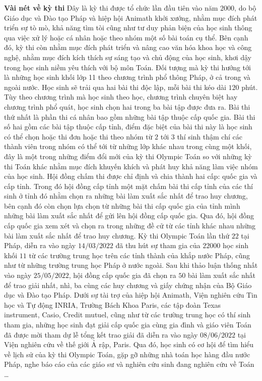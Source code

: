 \begin{multicols}{2}
	\textbf{\color{cackithi}Vài nét về kỳ thi}
	\vskip 0.1cm
	Đây là kỳ thi được tổ chức lần đầu tiên vào năm $2000$, do bộ Giáo dục và Đào tạo Pháp và hiệp hội Animath khởi xướng, nhằm mục đích phát triển sự tò mò, khả năng tìm tòi cũng như tư duy phản biện của học sinh thông qua việc xử lý hoặc cá nhân hoặc theo nhóm một số bài toán cụ thể. Bên cạnh đó, kỳ thi còn nhằm mục đích phát triển và nâng cao văn hóa khoa học và công nghệ, nhằm mục đích kích thích sự sáng tạo và chủ động của học sinh, khơi dậy trong học sinh niềm yêu thích với bộ môn Toán. Đối tượng mà kỳ thi hướng tới là những học sinh khối lớp 11 theo chương trình phổ thông Pháp, ở cả trong và ngoài nước. 
	\vskip 0.1cm
	Học sinh sẽ trải qua hai bài thi độc lập, mỗi bài thi kéo dài $120$ phút. Tùy theo chương trình mà học sinh theo học, chương trình chuyên biệt hay chương trình phổ quát, học sinh chọn hai trong ba bài tập được đưa ra. Bài thi thứ nhất là phần thi cá nhân bao gồm những bài tập thuộc cấp quốc gia. Bài thi số hai gồm các bài tập thuộc cấp tỉnh, điểm đặc biệt của bài thi này là học sinh có thể chọn hoặc thi đơn hoặc thi theo nhóm từ $2$ tới $3$ thí sinh thậm chí các thành viên trong nhóm có thể tới từ những lớp khác nhau trong cùng một khối, đây là một trong những điểm đổi mới của kỳ thi Olympic Toán so với những kỳ thi Toán khác nhằm mục đích khuyến khích và phát huy khả năng làm việc nhóm của học sinh.
	\vskip 0.1cm 
	Hội đồng chấm thi được chỉ định và chia thành hai cấp: quốc gia và cấp tỉnh. Trong đó hội đồng cấp tỉnh một mặt chấm bài thi cấp tỉnh của các thí sinh ở tỉnh đó nhằm chọn ra những bài làm xuất sắc nhất để trao huy chương, bên cạnh đó còn chọn lựa chọn từ những bài thi cấp quốc gia của tỉnh mình những bài làm xuất sắc nhất để gửi lên hội đồng cấp quốc gia. Qua đó, hội đồng cấp quốc gia xem xét và chọn ra trong những đề cử từ các tỉnh khác nhau những bài làm xuất sắc nhất để trao huy chương. 
	\vskip 0.1cm
	Kỳ thi Olympic Toán lần thứ $22$ tại Pháp, diễn ra vào ngày $14/03/2022$ đã thu hút sự tham gia của $22000$ học sinh khối $11$ từ các trường trung học trên các tỉnh thành của khắp nước Pháp, cũng như từ những trường trung học Pháp ở nước ngoài. Sau khi thảo luận thống nhất vào ngày $25/05/2022$, hội đồng cấp quốc gia đã chọn ra $50$ bài làm xuất sắc nhất để trao giải nhất, nhì, ba cùng các huy chương và giấy chứng nhận của Bộ Giáo dục và Đào tạo Pháp. Dưới sự tài trợ của hiệp hội Animath, Viện nghiên cứu Tin học và Tự động  INRIA, Trường Bách Khoa Paris, các tập đoàn Texas instrument, Casio, Credit mutuel, cũng như từ các trường trung học có thí sinh tham gia, những học sinh đạt giải cấp quốc gia cùng gia đình và giáo viên Toán đã được mời tham dự lễ tổng kết trao giải đã diễn ra vào ngày $08/06/2022$ tại Viện nghiên cứu về thế giới Ả rập, Paris. Qua đó, học sinh có cơ hội để tìm hiểu về lịch sử của kỳ thi Olympic Toán, gặp gỡ những nhà toán học hàng đầu nước Pháp, nghe báo cáo của các giáo sư và nghiên cứu sinh đang nghiên cứu về Toán \ldots 

\end{multicols}
